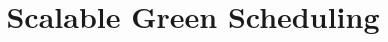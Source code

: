 \documentclass{sig-alternate}
\begin{document}
%

\title{Scalable Green Scheduling}
%
%
%
%
%
\end{document}
